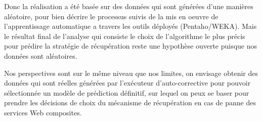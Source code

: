 Donc la réalisation a été basée sur des données qui sont générées d'une manières aléatoire, pour bien décrire le processus suivis de la mis en oeuvre de l'apprentissage automatique a travers les outils déployés (Pentaho/WEKA).
Mais le résultat final de l'analyse qui consiste le choix de l'algorithme le plus précis pour prédire la stratégie de récupération reste une hypothèse ouverte puisque nos données sont aléatoires.
 
Nos perspectives sont sur le même niveau que nos limites, on envisage obtenir des données qui sont réelles générées par l'exécuteur d'auto-corrective pour pouvoir sélectionnée un modèle de prédiction définitif, sur lequel on peux se baser pour prendre les décisions de choix du mécanisme de récupération en cas de panne des services Web composites.


